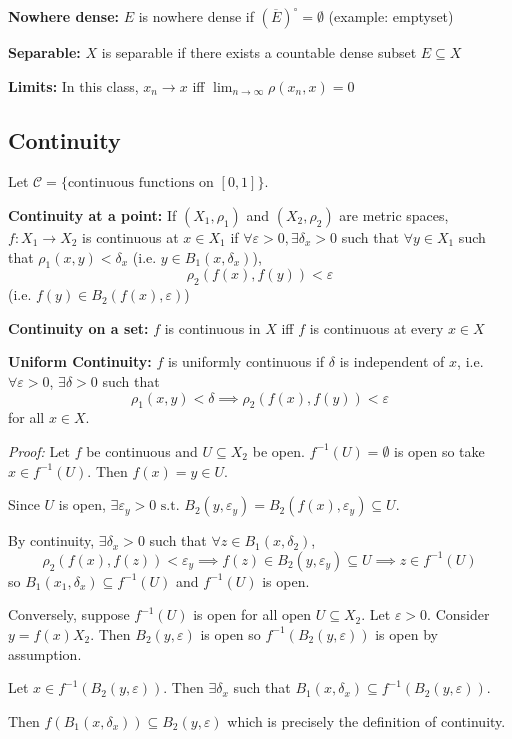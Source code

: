 \documentclass[12pt]{article}
\newcommand{\ep}{\varepsilon}
\newcommand{\sub}{\subseteq}
\newcommand{\st}{\text{ s.t. }}
\renewcommand{\bar}[1]{\overline{#1}}
\newenvironment*{tbox}[2][gray]{
    \begin{tcolorbox}[
        parbox=false,
        colback=#1!5!white,
        colframe=#1!75!black,
        breakable,
        title={#2}
    ]}
    {\end{tcolorbox}}
\begin{document}
    \textbf{Nowhere dense:} $E$ is nowhere dense if $(\bar E)^{\circ} = \emptyset$ (example: emptyset)

    \textbf{Separable:} $X$ is separable if there exists a countable dense subset $E \sub X$

    \textbf{Limits:} In this class, $x_n \to x$ iff $\lim_{n\to\infty} \rho(x_n, x) = 0$

\subsection*{Continuity} 
    Let $\mathcal C = \{\text{continuous functions on } [0,1]\}$.

    \textbf{Continuity at a point:} If $(X_1, \rho_1)$ and $(X_2, \rho_2)$ are metric spaces, $f: X_1 \to X_2$ is continuous at $x \in X_1$ if $\forall \ep > 0, \exists \delta_x > 0$ such that $\forall y \in X_1$ such that $\rho_1(x, y) < \delta_x$ (i.e. $y \in B_1(x, \delta_x)$),  
    \[\rho_2(f(x), f(y)) < \ep\]
    (i.e. $f(y) \in B_2(f(x), \ep)$)

    \textbf{Continuity on a set:} $f$ is continuous in $X$ iff $f$ is continuous at every $x \in X$

    \textbf{Uniform Continuity:} $f$ is uniformly continuous if $\delta$ is independent of $x$, i.e. $\forall \ep > 0$, $\exists \delta > 0$ such that 
    \[\rho_1(x, y) < \delta \implies \rho_2(f(x), f(y)) < \ep\]
    for all $x \in X$. 

    \begin{tbox}{\textbf{Proposition:} $f: X_1 \to X_2$ is continuous iff $f^{-1}(U) \sub X_1$ is open for all open $U \sub X_2$}
        \emph{Proof:} Let $f$ be continuous and $U \sub X_2$ be open. $f^{-1}(U) = \emptyset$ is open so take $x \in f^{-1}(U)$. Then $f(x) = y \in U$. 
        
        Since $U$ is open, $\exists \ep_y > 0 \st B_2(y, \ep_y) = B_2(f(x), \ep_y) \sub U$. 
        
        By continuity, $\exists \delta_x > 0$ such that $\forall z \in B_1(x, \delta_2)$, 
        \[\rho_2(f(x), f(z)) < \ep_y \implies f(z) \in B_2(y, \ep_y) \sub U \implies z \in f^{-1}(U)\]
        so $B_1(x_1, \delta_x) \sub f^{-1}(U)$ and $f^{-1}(U)$ is open.

        Conversely, suppose $f^{-1}(U)$ is open for all open $U \sub X_2$. Let $\ep > 0$. Consider $y = f(x) X_2$. Then $B_2(y, \ep)$ is open so $f^{-1}(B_2(y, \ep))$ is open by assumption. 
        
        Let $x \in f^{-1}(B_2(y, \ep))$. Then $\exists \delta_x$ such that $B_1(x, \delta_x) \sub f^{-1}(B_2(y, \ep))$. 

        Then $f(B_1(x, \delta_x)) \sub B_2(y, \ep)$ which is precisely the definition of continuity.
    \end{tbox}
\end{document}
